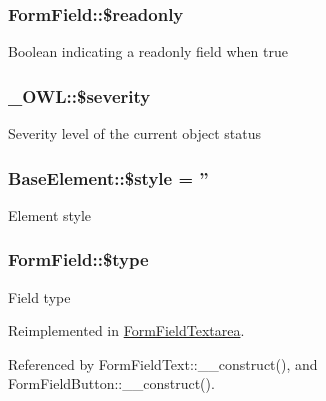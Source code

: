 \subsubsection[{\$readonly}]{\setlength{\rightskip}{0pt plus 5cm}FormField::\$readonly}\label{classFormField_a78ba5d4b9127e75e8ccf86f397b5d9ac}
Boolean indicating a readonly field when true 
\subsubsection[{\$severity}]{\setlength{\rightskip}{0pt plus 5cm}\_\-OWL::\$severity}\label{class__OWL_ad26b40a9dbbacb33e299b17826f8327c}
Severity level of the current object status 
\subsubsection[{\$style}]{\setlength{\rightskip}{0pt plus 5cm}BaseElement::\$style = ''}\label{classBaseElement_a429a3d642dd95f30e1059ef29564b87d}
Element style 
\subsubsection[{\$type}]{\setlength{\rightskip}{0pt plus 5cm}FormField::\$type}\label{classFormField_a37bed21a1891e95be0e4a697e45ba51b}
Field type 

Reimplemented in \hyperlink{classFormFieldTextarea_a85348034822c70694fc8640bfcacc04d}{FormFieldTextarea}.



Referenced by FormFieldText::\_\-\_\-construct(), and FormFieldButton::\_\-\_\-construct().

